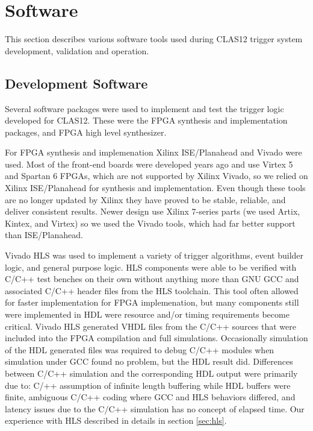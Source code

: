 \section{Software}

This section describes various software tools used during CLAS12 trigger system development, validation and operation.

\subsection{Development Software}

Several software packages were used to implement and test the trigger logic developed for CLAS12. These were the FPGA synthesis and implementation packages, and FPGA high level synthesizer.

For FPGA synthesis and implemenation Xilinx ISE/Planahead and Vivado were used. Most of the front-end boards were developed years ago and use Virtex 5 and Spartan 6 FPGAs, which are not supported by Xilinx Vivado, so we relied on Xilinx ISE/Planahead for synthesis and implementation. Even though these tools are no longer updated by Xilinx they have proved to be stable, reliable, and deliver consistent results. Newer design use Xilinx 7-series parts (we used Artix, Kintex, and Virtex) so we used the Vivado tools, which had far better support than ISE/Planahead.

Vivado HLS was used to implement a variety of trigger algorithms, event builder logic, and general purpose logic. HLS components were able to be verified with C/C++ test benches on their own without anything more than GNU GCC and associated C/C++ header files from the HLS toolchain. This tool often allowed for faster implementation for FPGA implemenation, but many components still were implemented in HDL were resource and/or timing requirements become critical. Vivado HLS generated VHDL files from the C/C++ sources that were included into the FPGA compilation and full simulations. Occasionally simulation of the HDL generated files was required to debug C/C++ modules when simulation under GCC found no problem, but the HDL result did. Differences between C/C++ simulation and the corresponding HDL output were primarily due to: C/++ assumption of infinite length buffering while HDL buffers were finite, ambiguous C/C++ coding where GCC and HLS behaviors differed, and latency issues due to the C/C++ simulation has no concept of elapsed time. Our experience with HLS described in details in section \ref{sec:hls}.

